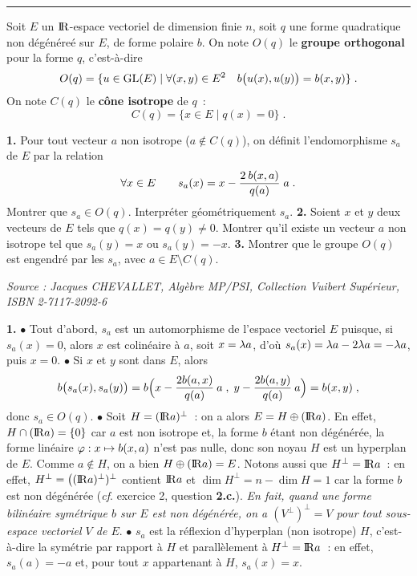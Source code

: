 \documentclass{article}
\begin{document}
\bsk
\hrule
\bsk


Soit $E$ un ${\rm I\kern-0.6mm R}$-espace vectoriel de dimension finie $n$, soit $q$ une forme quadratique non d\'eg\'en\'ere\'e sur $E$, de forme polaire $b$. On note $O(q)$ le {\bf groupe orthogonal} pour la forme $q$, c'est-\`a-dire\vv
$$O(q)=\{u\in{\rm GL}(E)\;|\;\forall (x,y)\in E^2\quad b\big(u(x),u(y)\big)=b(x,y)\}\;.$$
On note $C(q)$ le {\bf c\^one isotrope} de $q$~:\vv
$$C(q)=\{x\in E\;|\; q(x)=0\}\;.$$\par
{\bf 1.} Pour tout vecteur $a$ non isotrope ($a\not\in C(q)$), on d\'efinit l'endomorphisme $s_a$ de $E$ par la relation\vv
$$\forall x\in E\qquad s_a(x)=x-{2\>b(x,a)\over q(a)}\;a\;.$$
Montrer que $s_a\in O(q)$. Interpr\'eter g\'eom\'etriquement $s_a$.\msk
{\bf 2.} Soient $x$ et $y$ deux vecteurs de $E$ tels que $q(x)=q(y)\not=0$. Montrer qu'il existe un vecteur $a$ non isotrope tel que $s_a(y)=x$ ou $s_a(y)=-x$.\msk
{\bf 3.} Montrer que le groupe $O(q)$ est engendr\'e par les $s_a$, avec $a\in E\setminus C(q)$.

\msk
{\it Source : Jacques CHEVALLET, Alg\`ebre MP/PSI, Collection Vuibert Sup\'erieur, ISBN 2-7117-2092-6}

\msk
\cl{- - - - - - - - - - - - - - - - - - - - - - - - - - - - - - }
\msk

{\bf 1.} $\bullet$ Tout d'abord, $s_a$ est un automorphisme de l'espace vectoriel $E$ puisque, si $s_a(x)=0$, alors $x$ est colin\'eaire \`a $a$, soit $x=\lambda a$, d'o\`u $s_a(x)=\lambda a-2\lambda a=-\lambda a$, puis $x=0$.\ssk\sect
$\bullet$ Si $x$ et $y$ sont dans $E$, alors\vv
$$b\big(s_a(x),s_a(y)\big)=b\Big(x-{2b(a,x)\over q(a)}\>a\;,\;y-{2b(a,y)\over q(a)}\>a\Big)=b(x,y)\;,$$
donc $s_a\in O(q)$.\ssk\sect
$\bullet$ Soit $H=({\rm I\kern-0.6mm R} a)^\perp$~: on a alors $E=H\oplus({\rm I\kern-0.6mm R} a)$. En effet, $H\cap({\rm I\kern-0.6mm R} a)=\{0\}$ car $a$ est non isotrope et, la forme $b$ \'etant non d\'eg\'en\'er\'ee, la forme lin\'eaire $\varphi:x\mapsto b(x,a)$ n'est pas nulle, donc son noyau $H$ est un hyperplan de $E$. Comme $a\not\in H$, on a bien $H\oplus({\rm I\kern-0.6mm R} a)=E$. Notons aussi que $H^\perp={\rm I\kern-0.6mm R} a$~: en effet, $H^\perp=\big(({\rm I\kern-0.6mm R} a)^\perp)^\perp$ contient ${\rm I\kern-0.6mm R} a$ et $\dim H^\perp=n-\dim H=1$ car la forme $b$ est non d\'eg\'en\'er\'ee ({\it cf}. exercice 2, question {\bf 2.c.}). {\it En fait, quand une forme bilin\'eaire sym\'etrique $b$ sur $E$ est non d\'eg\'en\'er\'ee, on a $(V^\perp)^\perp=V$ pour tout sous-espace vectoriel $V$ de $E$}. 
\ssk\sect
$\bullet$ $s_a$ est la r\'eflexion d'hyperplan (non isotrope) $H$, c'est-\`a-dire la sym\'etrie par rapport \`a $H$ et parall\`element \`a $H^\perp={\rm I\kern-0.6mm R} a$~: en effet, $s_a(a)=-a$ et, pour tout $x$ appartenant \`a $H$, $s_a(x)=x$.
\end{document}
